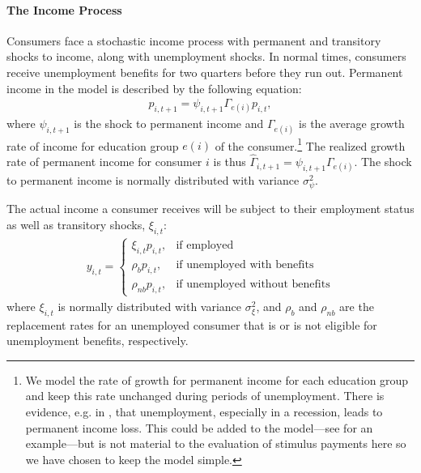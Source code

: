 \documentclass[../HAFiscal]{subfiles}
\begin{document}
\paragraph{The Income Process}
Consumers face a stochastic income process with permanent and transitory shocks to income, along with unemployment shocks. In normal times, consumers receive unemployment benefits for two quarters before they run out. Permanent income in the model is described by the following equation:
\begin{align}
p_{i,t+1} = \psi_{i,t+1}\Gamma_{e(i)}p_{i,t},
\end{align}
where $\psi_{i,t+1}$ is the shock to permanent income and $\Gamma_{e(i)}$ is the average growth rate of income for education group $e(i)$ of the consumer.\footnote{We model the rate of growth for permanent income for each education group and keep this rate unchanged during periods of unemployment. There is evidence, e.g. in \cite{davis_recessions_2011}, that unemployment, especially in a recession, leads to permanent income loss. This could be added to the model---see \citet{carroll2020modeling} for an example---but is not material to the evaluation of stimulus payments here so we have chosen to keep the model simple.  } The realized growth rate of permanent income for consumer $i$ is thus $\hat{\Gamma}_{i,t+1} = \psi_{i,t+1} \Gamma_{e(i)}$. The shock to permanent income is normally distributed with variance $\sigma_{\psi}^2$.
	
	The actual income a consumer receives will be subject to their employment status as well as transitory shocks, $\xi_{i,t}$:
	\begin{align}
		y_{i,t} =   \begin{cases}
						\xi_{i,t}p_{i,t}, & \text{if employed} \\
						\rho_b p_{i,t}, & \text{if unemployed with benefits} \\
						\rho_{nb} p_{i,t}, & \text{if unemployed without benefits} 
					\end{cases}
	\end{align}
	where $\xi_{i,t}$ is normally distributed with variance $\sigma_{\xi}^2$, and $\rho_b$ and $\rho_{nb}$ are the replacement rates for an unemployed consumer that is or is not eligible for unemployment benefits, respectively. 
	
\end{document}
